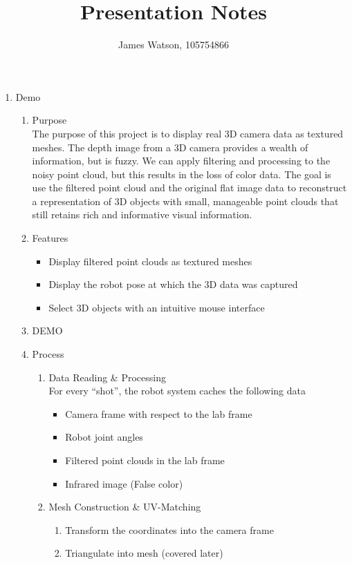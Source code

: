 \documentclass{hw_grad}
\title{Presentation Notes}
\institute{University of Colorado Boulder}
\author{James Watson, 105754866}
\begin{document}
	\maketitle
	
	\begin{enumerate}
		\item Demo
		\begin{enumerate}
			\item Purpose\\
			The purpose of this project is to display real 3D camera data as textured meshes.  The depth image from a 3D camera provides a wealth of information, but is fuzzy.  We can apply filtering and processing to the noisy point cloud, but this results in the loss of color data.  The goal is use the filtered point cloud and the original flat image data to reconstruct a representation of 3D objects with small, manageable point clouds that still retains rich and informative visual information. 
			\item Features
			\begin{itemize}
				\item Display filtered point clouds as textured meshes
				\item Display the robot pose at which the 3D data was captured
				\item Select 3D objects with an intuitive mouse interface
			\end{itemize}
			\item DEMO
			\item Process
			\begin{enumerate}
				\item Data Reading \& Processing \\
				For every ``shot'', the robot system caches the following data
				\begin{itemize}
					\item Camera frame with respect to the lab frame
					\item Robot joint angles
					\item Filtered point clouds in the lab frame
					\item Infrared image (False color)
				\end{itemize}
				\item Mesh Construction \& UV-Matching
				\begin{enumerate}
					\item Transform the coordinates into the camera frame
					\item Triangulate into mesh (covered later)

\end{enumerate}
\end{enumerate}
\end{enumerate}
\end{enumerate}
\end{document}
